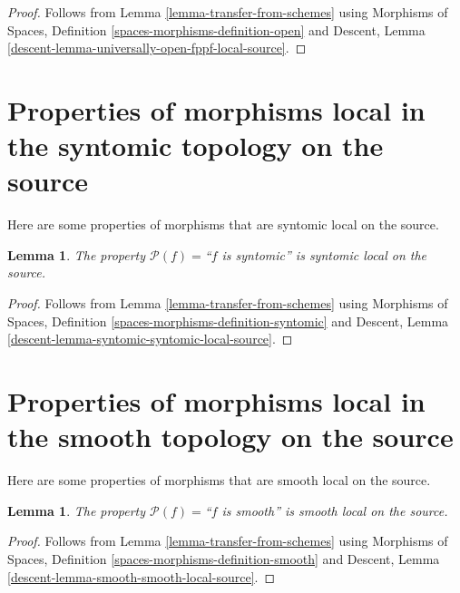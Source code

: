 \documentclass{stacks-project}
\theoremstyle{plain}
\newtheorem{lemma}[subsection]{Lemma}
\theoremstyle{definition}
\theoremstyle{remark}
\numberwithin{equation}{subsection}
\begin{document}
\begin{proof}
Follows from
Lemma \ref{lemma-transfer-from-schemes}
using
Morphisms of Spaces, Definition \ref{spaces-morphisms-definition-open}
and
Descent, Lemma \ref{descent-lemma-universally-open-fppf-local-source}.
\end{proof}



\section{Properties of morphisms local in the syntomic topology on the source}
\label{section-syntomic-local-source}

\noindent
Here are some properties of morphisms that are syntomic local on the source.

\begin{lemma}
\label{lemma-syntomic-syntomic-local-source}
The property $\mathcal{P}(f)=$``$f$ is syntomic''
is syntomic local on the source.
\end{lemma}

\begin{proof}
Follows from
Lemma \ref{lemma-transfer-from-schemes}
using
Morphisms of Spaces, Definition \ref{spaces-morphisms-definition-syntomic}
and
Descent, Lemma \ref{descent-lemma-syntomic-syntomic-local-source}.
\end{proof}




\section{Properties of morphisms local in the smooth topology on the source}
\label{section-smooth-local-source}

\noindent
Here are some properties of morphisms that are smooth local on the source.

\begin{lemma}
\label{lemma-smooth-smooth-local-source}
The property $\mathcal{P}(f)=$``$f$ is smooth''
is smooth local on the source.
\end{lemma}

\begin{proof}
Follows from
Lemma \ref{lemma-transfer-from-schemes}
using
Morphisms of Spaces, Definition \ref{spaces-morphisms-definition-smooth}
and
Descent, Lemma \ref{descent-lemma-smooth-smooth-local-source}.
\end{proof}
\end{document}
